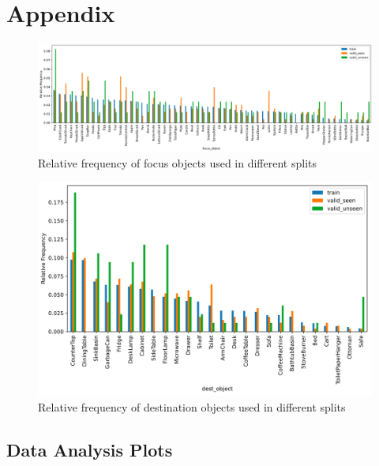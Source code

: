 \documentclass[11pt,a4paper]{article}
\begin{document}



\clearpage
\section{Appendix}

\begin{figure}
    \centering
    \includegraphics[scale=0.3]{figures/focus_obj_freqs.png}
    \caption{Relative frequency of focus objects used in different splits}
    \label{fig:focus}
\end{figure}

\begin{figure}
    \centering
    \includegraphics[scale=0.5]{figures/dest_obj_freqs.png}
    \caption{Relative frequency of destination objects used in different splits}
    \label{fig:dest}
\end{figure}


\subsection{Data Analysis Plots}
\end{document}
